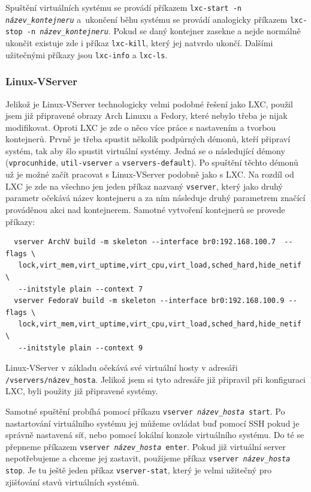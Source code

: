 Spuštění virtuálních systému se provádí příkazem \texttt{lxc-start -n \emph{název\_kontejneru}} a~ukončení běhu systému se provádí analogicky příkazem \texttt{lxc-stop -n \emph{název\_kontejneru}}. Pokud se daný kontejner zasekne a nejde normálně ukončit existuje zde i příkaz \texttt{lxc-kill}, který jej natvrdo ukončí. Dalšími užitečnými příkazy jsou \texttt{lxc-info} a \texttt{lxc-ls}.
\subsubsection{Linux-VServer}
Jelikož je Linux-VServer technologicky velmi podobné řešení jako LXC, použil jsem již připravené obrazy Arch Linuxu a Fedory, které nebylo třeba je nijak modifikovat.
Oproti LXC je zde o něco více práce s nastavením a tvorbou kontejnerů. Prvně je třeba spustit několik podpůrných démonů, kteří připraví systém, tak aby šlo spustit virtuální systémy. Jedná se o následující démony (\texttt{vprocunhide}, \texttt{util-vserver} a \texttt{vservers-default}). Po spuštění těchto démonů už je možné začít pracovat s Linux-VServer podobně jako s LXC. Na rozdíl od LXC je zde na všechno jen jeden příkaz nazvaný \texttt{vserver}, který jako druhý parametr očekává název kontejneru a za ním následuje druhý parametrem značící prováděnou akci nad kontejnerem. Samotné vytvoření kontejnerů se provede příkazy:
\begin{verbatim}
  vserver ArchV build -m skeleton --interface br0:192.168.100.7  --flags \
   lock,virt_mem,virt_uptime,virt_cpu,virt_load,sched_hard,hide_netif \
   --initstyle plain --context 7
  vserver FedoraV build -m skeleton --interface br0:192.168.100.9 --flags \
   lock,virt_mem,virt_uptime,virt_cpu,virt_load,sched_hard,hide_netif \
   --initstyle plain --context 9

\end{verbatim}

Linux-VServer v základu očekává své virtuální hosty v adresáři \texttt{/vservers/název\_hosta}. Jelikož jsem si tyto adresáře již připravil při konfiguraci LXC, byli použity již připravené systémy.

Samotné spuštění probíhá pomocí příkazu \verb!vserver !\texttt{\textit{název\_hosta} start}. Po nastartování virtuálního systému jej můžeme ovládat buď pomocí SSH pokud je správně nastavená síť, nebo pomocí lokální konzole virtuálního systému. Do té se přepneme příkazem \verb!vserver !\texttt{\textit{název\_hosta} enter}. Pokud již virtuální server nepotřebujeme a chceme jej zastavit, použijeme příkaz \verb!vserver !\texttt{\textit{název\_hosta} stop}.
Je tu ještě jeden příkaz \texttt{vserver-stat}, který je velmi užitečný pro zjišťování stavů virtuálních systémů.

